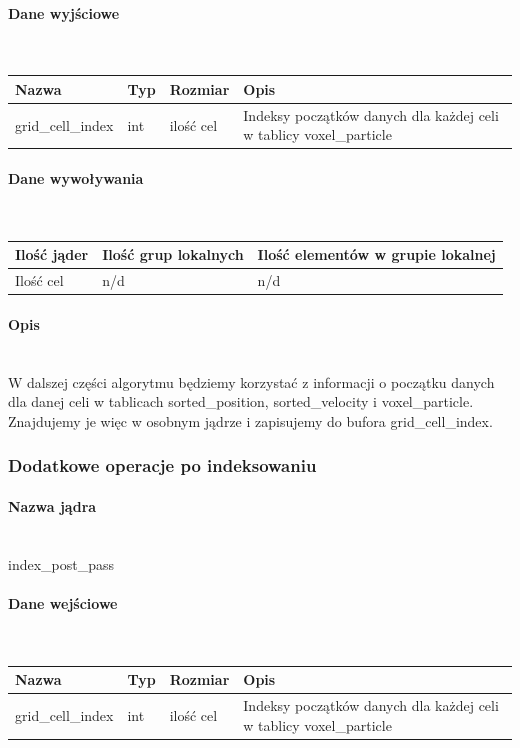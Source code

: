 \documentclass[polish, 12pt]{aghthesis}
\begin{document}
				\paragraph{Dane wyjściowe} \ \\
					\begin{tabular}{| p{} | p{} | p{} | p{} |}
					\hline
						Nazwa & Typ & Rozmiar & Opis \\
					\hline
						grid\_cell\_index & int & ilość cel & Indeksy początków danych dla każdej celi w tablicy voxel\_particle \\
					\hline
				\end{tabular}
				\paragraph{Dane wywoływania} \ \\
					\begin{tabular}{| p{} | p{} | p{}|}
					\hline
						Ilość jąder & Ilość grup lokalnych & Ilość elementów w grupie lokalnej \\
					\hline
						Ilość cel & n/d & n/d \\ 
					\hline
					\end{tabular}
				\paragraph{Opis} \ \\
					\indent W dalszej części algorytmu będziemy korzystać z informacji o początku danych dla danej celi w tablicach sorted\_position, sorted\_velocity i voxel\_particle. Znajdujemy je więc w osobnym jądrze i zapisujemy do bufora grid\_cell\_index.
					
			\subsubsection{Dodatkowe operacje po indeksowaniu}
				\paragraph{Nazwa jądra} \ \\
					index\_post\_pass
				\paragraph{Dane wejściowe} \ \\
					\begin{tabular}{| p{} | p{} | p{} | p{} |}
					\hline
						Nazwa & Typ & Rozmiar & Opis \\
					\hline
						grid\_cell\_index & int & ilość cel & Indeksy początków danych dla każdej celi w tablicy voxel\_particle \\
					\hline
				\end{tabular}
\end{document}

